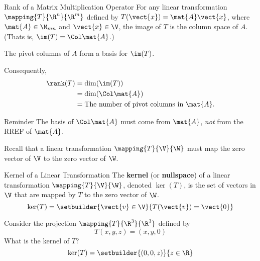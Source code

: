 \documentclass{beamer}
\begin{document}
\begin{frame}
\begin{block}{Rank of a Matrix Multiplication Operator}
For any linear transformation $\mapping{T}{\R^n}{\R^m}$ defined by $T(\vect{x})=\mat{A}\vect{x}$, where $\mat{A}\in\M_{mn}$ and $\vect{x}\in\V$, the image of $T$ is the column space of $A$. (Thats is, $\im(T)=\Col\mat{A}$.) 

\vspace{2mm}
The pivot columns of $A$ form a basis for $\im(T)$.

\vspace{2mm}
Consequently,
\begin{equation*}
\begin{aligned}
\rank(T) &= \dim(\im(T))\\
		 &= \dim(\Col\mat{A})\\
		 &= \text{The number of pivot columns in $\mat{A}$.}
\end{aligned}
\end{equation*}
\end{block}\pause
\begin{block}{Reminder}
The basis of $\Col\mat{A}$ must come from $\mat{A}$, \emph{not} from the RREF of $\mat{A}$.
\end{block}
\end{frame}

\begin{frame}
\begin{block}{}
Recall that a linear transformation $\mapping{T}{\V}{\W}$ must map the zero vector of $\V$ to the zero vector of $\W$.
\end{block}\pause
\begin{block}{Kernel of a Linear Transformation}
The \textbf{kernel} (or \textbf{nullspace}) of a linear transformation $\mapping{T}{\V}{\W}$, denoted $\ker(T)$, is the set of vectors in $\V$ that are mapped by $T$ to the zero vector of $\W$.
\begin{equation*}
\ker(T)=\setbuilder{\vect{v}\in\V}{T(\vect{v})=\vect{0}}
\end{equation*}
\end{block}\pause
\begin{example}
Consider the projection $\mapping{T}{\R^3}{\R^3}$ defined by
\begin{equation*}
T(x,y,z)=(x,y,0)
\end{equation*}
What is the kernel of $T$?\pause
\begin{equation*}
\ker(T)=\setbuilder{(0,0,z)}{z\in\R}
\end{equation*}
\end{example}
\end{frame}
\end{document}
